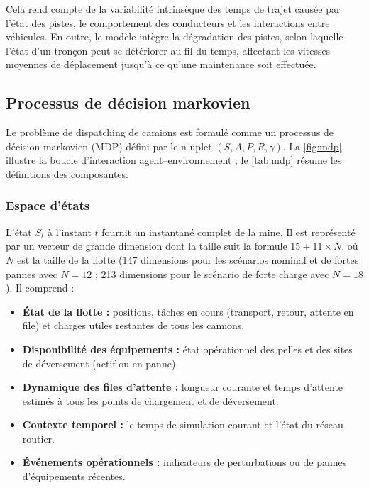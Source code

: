 \documentclass[11pt,a4paper]{article}
\begin{document}
Cela rend compte de la variabilité intrinsèque des temps de trajet causée par l'état des pistes, le comportement des conducteurs et les interactions entre véhicules. En outre, le modèle intègre la dégradation des pistes, selon laquelle l'état d'un tronçon peut se détériorer au fil du temps, affectant les vitesses moyennes de déplacement jusqu'à ce qu'une maintenance soit effectuée.

\subsection{Processus de décision markovien}

Le problème de dispatching de camions est formulé comme un processus de décision markovien (MDP) défini par le n-uplet $(S, A, P, R, \gamma)$. La \cref{fig:mdp} illustre la boucle d'interaction agent--environnement ; le \cref{tab:mdp} résume les définitions des composantes.

\subsubsection{Espace d'états}

L'état $S_t$ à l'instant $t$ fournit un instantané complet de la mine. Il est représenté par un vecteur de grande dimension dont la taille suit la formule $15 + 11 \times N$, où $N$ est la taille de la flotte (147 dimensions pour les scénarios nominal et de fortes pannes avec $N=12$ ; 213 dimensions pour le scénario de forte charge avec $N=18$). Il comprend :

\begin{itemize}
  \item \textbf{État de la flotte :} positions, tâches en cours (transport, retour, attente en file) et charges utiles restantes de tous les camions.
  \item \textbf{Disponibilité des équipements :} état opérationnel des pelles et des sites de déversement (actif ou en panne).
  \item \textbf{Dynamique des files d'attente :} longueur courante et temps d'attente estimés à tous les points de chargement et de déversement.
  \item \textbf{Contexte temporel :} le temps de simulation courant et l'état du réseau routier.
  \item \textbf{Événements opérationnels :} indicateurs de perturbations ou de pannes d'équipements récentes.
\end{itemize}
\end{document}

